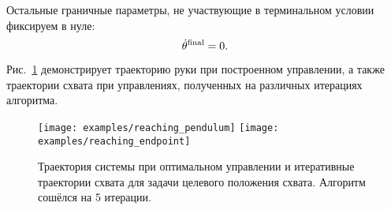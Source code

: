 \documentclass[../../doc.tex]{subfiles}
\begin{document}
    Остальные граничные параметры, не участвующие в терминальном условии фиксируем в нуле:
    \begin{equation*}
        \dot \theta^{\textnormal{final}} = 0.
    \end{equation*}

    Рис.~\ref{fig:reaching-task} демонстрирует траекторию руки при построенном управлении, а также траектории схвата при управлениях, полученных на различных итерациях алгоритма.

    \begin{figure}[h]
        \begin{center}
            \texttt{[image: examples/reaching\_pendulum]}
            \texttt{[image: examples/reaching\_endpoint]}
        \end{center}
        \caption{Траектория системы при оптимальном управлении и итеративные траектории схвата для задачи целевого положения схвата. Алгоритм сошёлся на 5 итерации.}
        \label{fig:reaching-task}
    \end{figure}

    \ifSubfilesClassLoaded{
        \nocite{*}
        \clearpage
        
        
    }{}
\end{document}

